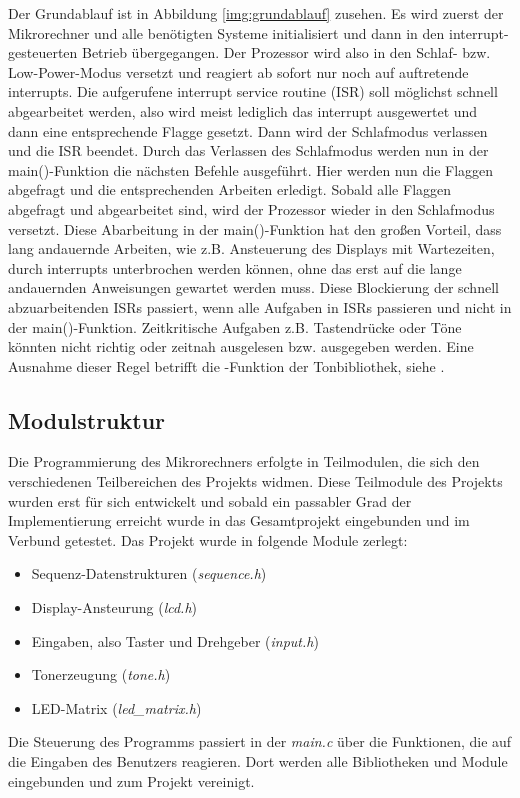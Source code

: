\newline
Der Grundablauf ist in Abbildung \ref{img:grundablauf} zusehen. Es wird zuerst der Mikrorechner und alle benötigten Systeme initialisiert und dann in den interrupt-gesteuerten Betrieb übergegangen. Der Prozessor wird also in den Schlaf- bzw. Low-Power-Modus versetzt und reagiert ab sofort nur noch auf auftretende interrupts. Die aufgerufene interrupt service routine (ISR) soll möglichst schnell abgearbeitet werden, also wird meist lediglich das interrupt ausgewertet und dann eine entsprechende Flagge gesetzt. Dann wird der Schlafmodus verlassen und die ISR beendet. Durch das Verlassen des Schlafmodus werden nun in der main()-Funktion die nächsten Befehle ausgeführt. Hier werden nun die Flaggen abgefragt und die entsprechenden Arbeiten erledigt. Sobald alle Flaggen abgefragt und abgearbeitet sind, wird der Prozessor wieder in den Schlafmodus versetzt. Diese Abarbeitung in der main()-Funktion hat den großen Vorteil, dass lang andauernde Arbeiten, wie z.B. Ansteuerung des Displays mit Wartezeiten, durch interrupts unterbrochen werden können, ohne das erst auf die lange andauernden Anweisungen gewartet werden muss. Diese Blockierung der schnell abzuarbeitenden ISRs passiert, wenn alle Aufgaben in ISRs passieren und nicht in der main()-Funktion. Zeitkritische Aufgaben z.B. Tastendrücke oder Töne könnten nicht richtig oder zeitnah ausgelesen bzw. ausgegeben werden. Eine Ausnahme dieser Regel betrifft die -Funktion der Tonbibliothek, siehe .%

\subsection{Modulstruktur}
Die Programmierung des Mikrorechners erfolgte in Teilmodulen, die sich den verschiedenen Teilbereichen des Projekts widmen. Diese Teilmodule des Projekts wurden erst für sich entwickelt und sobald ein passabler Grad der Implementierung erreicht wurde in das Gesamtprojekt eingebunden und im Verbund getestet. Das Projekt wurde in folgende Module zerlegt:
\begin{itemize}
    \item Sequenz-Datenstrukturen (\textsl{sequence.h})
	\item Display-Ansteurung (\textsl{lcd.h})
	\item Eingaben, also Taster und Drehgeber (\textsl{input.h})
	\item Tonerzeugung (\textsl{tone.h})
	\item LED-Matrix (\textsl{led\_matrix.h})
\end{itemize}
Die Steuerung des Programms passiert in der \textsl{main.c} über die Funktionen, die auf die Eingaben des Benutzers reagieren. Dort werden alle Bibliotheken und Module eingebunden und zum Projekt vereinigt.

